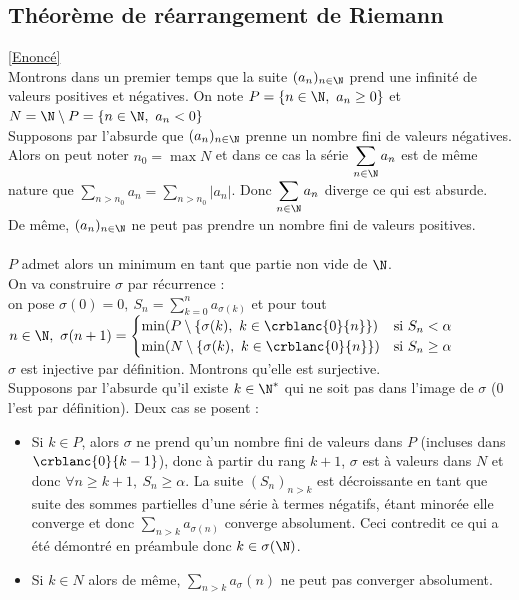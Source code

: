 \documentclass{book}
\begin{document}
	\subsection{Théorème de réarrangement de Riemann }\label{sec:theoreme-de-rearrangement-de-riemann-etoile5}
	\textcolor{blue}{\hyperref[Théorème de réarrangement de Riemann]{[Enoncé]}}\\
	Montrons dans un premier temps que la suite $(a_n)_{n\in \N}$ prend une infinité de valeurs positives et négatives. On note $P=\{n\in \N,\ a_n\geq 0\}$ et $N=\N\setminus P=\{n\in \N,\ a_n<0\}$\\
	Supposons par l'absurde que $(a_n)_{n\in \N}$ prenne un nombre fini de valeurs négatives.\\
	Alors on peut noter $n_0=\max N$ et dans ce cas la série $\displaystyle\sum\limits_{n\in \N}a_n$ est de même nature que $\displaystyle\sum\limits_{n>n_0}a_n=\sum\limits_{n>n_0}|a_n|$. Donc $\displaystyle\sum\limits_{n\in \N}a_n$ diverge ce qui est absurde.\\
	De même, $(a_n)_{n\in \N}$ ne peut pas prendre un nombre fini de valeurs positives.\\\\
	$P$ admet alors un minimum en tant que partie non vide de $\N$.\\
	On va construire $\sigma$ par récurrence :\\
	on pose $\sigma(0)=0,\ S_n=\displaystyle\sum\limits_{k=0}^na_{\sigma(k)}$ et pour tout $n\in \N,\ \sigma(n+1)=
	\begin{cases}
		\min(P\setminus\{\sigma(k),\ k\in \crblanc{0}{n}\})&\mbox{si }S_n<\alpha\\
		\min(N\setminus\{\sigma(k),\ k\in \crblanc{0}{n}\})&\mbox{si }S_n\geq\alpha
	\end{cases}$\\
	$\sigma$ est injective par définition. Montrons qu'elle est surjective.\\
	Supposons par l'absurde qu'il existe $k\in \N^*$ qui ne soit pas dans l'image de $\sigma$ (0 l'est par définition). Deux cas se posent :
	\begin{itemize}
		\item Si $k\in P$, alors $\sigma$ ne prend qu'un nombre fini de valeurs dans $P$ (incluses dans $\crblanc{0}{k-1}$), donc à partir du rang $k+1$, $\sigma$ est à valeurs dans $N$ et donc $\forall n\geq k+1,\ S_n\geq\alpha$. La suite $(S_n)_{n>k}$ est décroissante en tant que suite des sommes partielles d'une série à termes négatifs, étant minorée elle converge et donc $\displaystyle\sum\limits_{n>k}a_{\sigma(n)}$ converge absolument. Ceci contredit ce qui a été démontré en préambule donc $k\in \sigma(\N)$.
		\item Si $k\in N$ alors de même, $\displaystyle\sum\limits_{n>k}a_\sigma(n)$ ne peut pas converger absolument.
	\end{itemize}
\end{document}
